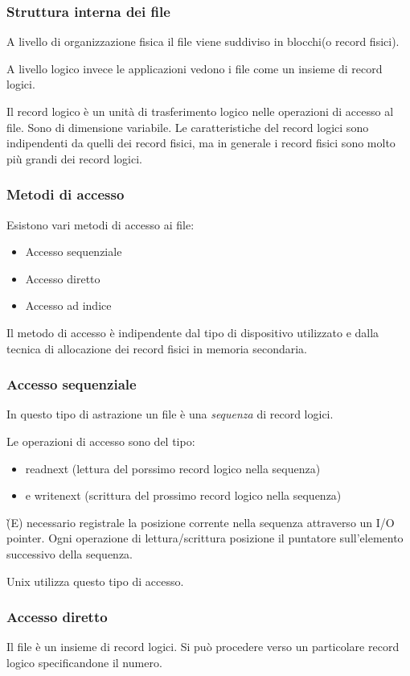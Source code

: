 \documentclass
[10pt,        %
 a4paper,     %
 onecolumn,   %
 fleqn,       %
 oneside,     %
 notitlepage, %
]{article}    %
\begin{document}
\subsubsection{Struttura interna dei file}
A livello di organizzazione fisica il file viene suddiviso in blocchi(o record fisici).

A livello logico invece le applicazioni vedono i file come un insieme di record logici.

Il record logico è un unità di trasferimento logico nelle operazioni di accesso al file. Sono di dimensione variabile. Le caratteristiche del record logici sono indipendenti da quelli dei record fisici, ma in generale i record fisici sono molto più grandi dei record logici.

\subsubsection{Metodi di accesso}
Esistono vari metodi di accesso ai file:
\begin{itemize}
    \item Accesso sequenziale
    \item Accesso diretto
    \item Accesso ad indice
\end{itemize}

Il metodo di accesso è indipendente dal tipo di dispositivo utilizzato e dalla tecnica di allocazione dei record fisici in memoria secondaria.

\subsubsection{Accesso sequenziale}
In questo tipo di astrazione un file è una \textit{sequenza} di record logici.

Le operazioni di accesso sono del tipo:
\begin{itemize}
    \item readnext (lettura del porssimo record logico nella sequenza)
    \item e writenext (scrittura del prossimo record logico nella sequenza)
\end{itemize}  
\`(E) necessario registrale la posizione corrente nella sequenza attraverso un I/O pointer. Ogni operazione di lettura/scrittura posizione il puntatore sull'elemento successivo della sequenza.

Unix utilizza questo tipo di accesso.

\subsubsection{Accesso diretto}
Il file è un insieme di record logici. Si può procedere verso un particolare record logico specificandone il numero.
\end{document}
